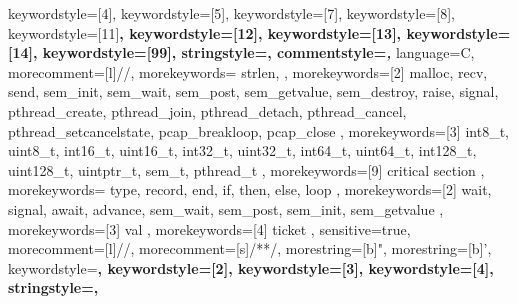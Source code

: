 {    keywordstyle=[4]\color{lstCol_C_green},%
    keywordstyle=[5]\color{lstCol_C_collection},%
    keywordstyle=[7]\color{lstCol_C_purple},%
    keywordstyle=[8]\color{lstCol_C_violet},%
    keywordstyle=[11]\color{lstCol_C_foreign1}\bfseries,%
    keywordstyle=[12]\color{lstCol_C_foreign2}\bfseries,%
    keywordstyle=[13]\color{lstCol_C_object},%
    keywordstyle=[14]\color{lstCol_C_moreKey},%
    keywordstyle=[99]\color{red}\bfseries,%
    stringstyle=\color{eclipse_1_string},%
    commentstyle=\color{eclipse_1_comment}\itshape,%
}%
%
{%
	language=C,%
	morecomment=[l]{//},%
	morekeywords={%
		strlen,
	},%
	morekeywords=[2]{%
		malloc,
		recv,
		send,
		sem_init,
		sem_wait,
		sem_post,
		sem_getvalue,
		sem_destroy,
		raise,
		signal,
		pthread_create,
		pthread_join,
		pthread_detach,
		pthread_cancel,
		pthread_setcancelstate,
		pcap_breakloop,
		pcap_close
	},%
	morekeywords=[3]{%
		int8_t,
		uint8_t,
		int16_t,
		uint16_t,
		int32_t,
		uint32_t,
		int64_t,
		uint64_t,
		int128_t,
		uint128_t,
		uintptr_t,
		sem_t,
		pthread_t
	},%
	morekeywords=[9]{%
		critical section
	},%
}%
%
{%
	morekeywords={%
		type,
		record,
		end,
		if,
		then,
		else,
		loop
	},%
	morekeywords=[2]{%
		wait,
		signal,
		await,
		advance,
		sem_wait,
		sem_post,
		sem_init,
		sem_getvalue
	},%
	morekeywords=[3]{%
		val
	},%
	morekeywords=[4]{%
		ticket
	},%
	sensitive=true,%
	morecomment=[l]{//},%
	morecomment=[s]{/*}{*/},%
	morestring=[b]",%
	morestring=[b]',%
	keywordstyle=\bfseries\ttfamily\color{blue},%
	keywordstyle=[2]\bfseries\ttfamily\color{teal},%
	keywordstyle=[3]\bfseries\ttfamily\color{olive},%
	keywordstyle=[4]\bfseries\ttfamily\color{olive},%
	stringstyle=\color{green}\ttfamily,%
}%
%
%
%
%
%
%
%
%
%
%
